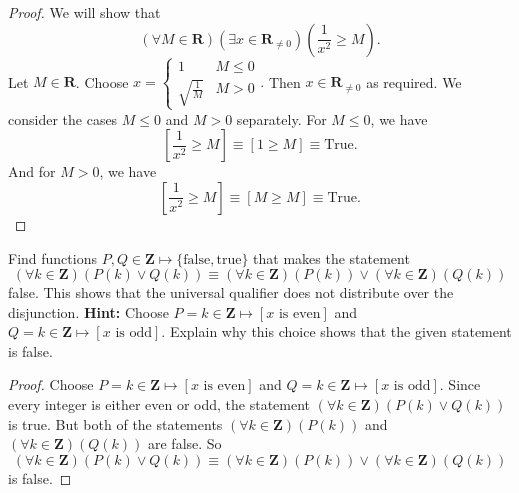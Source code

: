 \documentclass[12pt,fleqn,answers]{exam}
\newcommand{\reals}{\mathbf{R}}
\newcommand{\integers}{\mathbf{Z}}
\renewenvironment{solution}
  {\begin{shaded*}} %
  {\end{shaded*}}   %
\begin{document}
\begin{questions}
\begin{solution}
  \begin{proof} We will show that
    \begin{equation*}
      \left(\forall M \in \reals\right)
      \left(\exists x \in \reals_{\neq 0} \right)
      \left(\frac{1}{x^2} \geq  M \right).
    \end{equation*}
  Let $M \in \reals$. Choose $x = 
    \begin{cases} 1 & M \leq 0 \\ \sqrt{\frac{1}{M}} & M > 0 
    \end{cases}.$ Then $x  \in \reals_{\neq 0}$ as required.
    We consider the cases $M \leq 0$ and $M > 0$ separately.
    For $M \leq 0$, we have
    \begin{equation*}
      \left[\frac{1}{x^2} \geq  M \right] \equiv \left[1 \geq M \right]
      \equiv \text{True}.
    \end{equation*}
    And for $M > 0$, we have
    \begin{equation*}
      \left[\frac{1}{x^2} \geq  M \right] \equiv 
      \left[M \geq M \right]
      \equiv \text{True}.
    \end{equation*}
  \end{proof}
\end{solution}


 
\question [10] Find functions $P,Q \in \integers \mapsto \{\mbox{false}, \mbox{true}\}$ that makes
the statement
\begin{equation*}
  \left(\forall k \in \integers\right) \left (P(k) \lor Q(k) \right) \equiv 
  \left(\forall k \in \integers\right) \left (P(k) \right)  \lor 
  \left(\forall k \in \integers\right) \left (Q(k) \right)  
\end{equation*}
false.  This shows that the universal qualifier does not distribute over the disjunction. 
\textbf{Hint:} Choose $P = k \in \integers \mapsto \left[x \mbox{ is even}\right]$
and $Q = k \in \integers \mapsto \left[x \mbox{ is odd}\right]$. Explain why this choice
shows that the given statement is false.

\begin{solution} 
  \begin{proof} 
    Choose $P = k \in \integers \mapsto \left[x \mbox{ is even}\right]$
    and $Q = k \in \integers \mapsto \left[x \mbox{ is odd}\right]$.
    Since every integer is either even or odd, the statement
  $ \left(\forall k \in \integers\right) \left (P(k) \lor Q(k) \right)$
  is true. But both of the statements $\left(\forall k \in \integers\right) \left (P(k) \right)$
  and $\left(\forall k \in \integers\right) \left (Q(k) \right)$ are 
  false. So 
  \begin{equation*}
    \left(\forall k \in \integers\right) \left (P(k) \lor Q(k) \right) \equiv 
    \left(\forall k \in \integers\right) \left (P(k) \right)  \lor 
    \left(\forall k \in \integers\right) \left (Q(k) \right)  
  \end{equation*}
  is false.    
  \end{proof}
  
 
\end{solution}

\end{questions}
\end{document}

